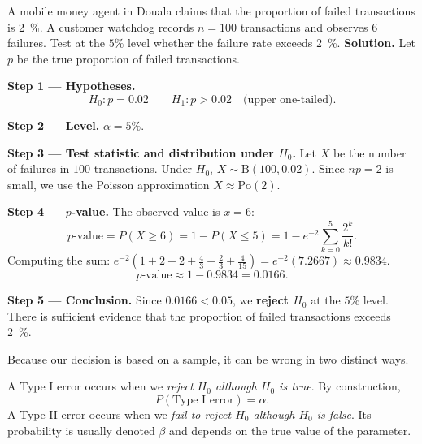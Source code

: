 \documentclass[11pt]{article}
\newcommand{\cle}[1]{{\popxbold\color{popdark}#1}}
\newcounter{popsec}
\newcounter{popsub}
\newcommand{\courssub}[1]{%
  \stepcounter{popsub}%
  \par\vspace{9pt}\noindent{\popxbold\fontsize{11.5}{13}\selectfont\color{popink}{\color{poporange}\thepopsec.\thepopsub}\hspace{6pt}#1}\par\nopagebreak\vspace{4pt}
}
\begin{document}
\begin{exoresolu}
A mobile money agent in Douala claims that the proportion of failed transactions is \SI{2}{\%}. A customer watchdog records $n = 100$ transactions and observes $6$ failures. Test at the $5\%$ level whether the failure rate exceeds \SI{2}{\%}.
\tcblower
\textbf{Solution.} Let $p$ be the true proportion of failed transactions.

\textbf{Step 1 --- Hypotheses.}
\[ H_0 : p = 0.02 \qquad H_1 : p > 0.02 \quad\text{(upper one-tailed)}. \]

\textbf{Step 2 --- Level.} $\alpha = 5\%$.

\textbf{Step 3 --- Test statistic and distribution under $H_0$.} Let $X$ be the number of failures in $100$ transactions. Under $H_0$, $X \sim \mathrm{B}(100, 0.02)$. Since $np = 2$ is small, we use the Poisson approximation $X \approx \mathrm{Po}(2)$.

\textbf{Step 4 --- $p$-value.} The observed value is $x = 6$:
\[ p\text{-value} = P(X \geq 6) = 1 - P(X \leq 5) = 1 - e^{-2}\sum_{k=0}^{5}\frac{2^k}{k!}. \]
Computing the sum: $e^{-2}\left(1 + 2 + 2 + \tfrac{4}{3} + \tfrac{2}{3} + \tfrac{4}{15}\right) = e^{-2}(7.2667) \approx 0.9834$.
\[ p\text{-value} \approx 1 - 0.9834 = 0.0166. \]

\textbf{Step 5 --- Conclusion.} Since $0.0166 < 0.05$, we \textbf{reject $H_0$} at the $5\%$ level. There is sufficient evidence that the proportion of failed transactions exceeds \SI{2}{\%}.
\end{exoresolu}

\courssub{Type I and Type II Errors}

Because our decision is based on a sample, it can be wrong in two distinct ways.

\begin{definition}
A \cle{Type I error} occurs when we \emph{reject $H_0$ although $H_0$ is true}. By construction,
\[ P(\text{Type I error}) = \alpha. \]
A \cle{Type II error} occurs when we \emph{fail to reject $H_0$ although $H_0$ is false}. Its probability is usually denoted $\beta$ and depends on the true value of the parameter.
\end{definition}
\end{document}
